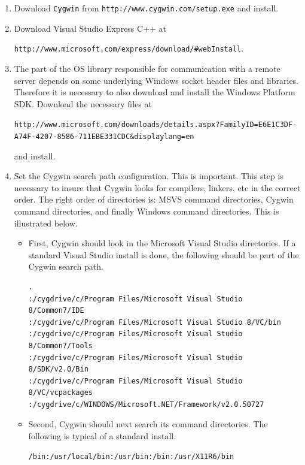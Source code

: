 \documentclass[11pt]{article}
\renewcommand{\_}{{\char"5F}}
\renewcommand{\{}{{\char"7B}}
\renewcommand{\}}{{\char"7D}}
\renewcommand{\^}{{\char"0D}}
\renewcommand{\'}{{\char"0D}}
\newcommand{\UrlCl}{http://www.microsoft.com/express/download/\#webInstall}
\newcommand{\UrlCygwinSetup}{http://www.cygwin.com/setup.exe}
\newcommand{\UrlSdk}{http://www.microsoft.com/downloads/details.aspx?FamilyID=E6E1C3DF-A74F-4207-8586-711EBE331CDC\&displaylang=en}
\begin{document}
\begin{enumerate}[Step 1:]
\item{}  Download {\tt Cygwin}  from {\tt\UrlCygwinSetup} and install.




\item{}  Download  Visual Studio Express C++ at  

{\tt\UrlCl}.


\item{}  The part of the OS library responsible for communication with a remote server depends on some
underlying Windows socket header files and libraries. Therefore it is necessary to also download and install
the Windows Platform SDK. Download the necessary files at

{\scriptsize\tt\UrlSdk}

 and install.



\item{}  Set the Cygwin search path configuration. This is important.
This step is necessary to insure that Cygwin   looks for compilers, linkers, etc in the correct order.  The right order of directories  is: MSVS command directories, Cygwin command directories, and finally Windows command directories.  This is illustrated below.

\begin{itemize}

 \item First, Cygwin should look in the Microsoft Visual Studio directories.
If a standard Visual Studio install is done, the following  should be part of the
Cygwin search path.

\begin{verbatim}
.
:/cygdrive/c/Program Files/Microsoft Visual Studio 8/Common7/IDE
:/cygdrive/c/Program Files/Microsoft Visual Studio 8/VC/bin
:/cygdrive/c/Program Files/Microsoft Visual Studio 8/Common7/Tools
:/cygdrive/c/Program Files/Microsoft Visual Studio 8/SDK/v2.0/Bin
:/cygdrive/c/Program Files/Microsoft Visual Studio 8/VC/vcpackages
:/cygdrive/c/WINDOWS/Microsoft.NET/Framework/v2.0.50727
\end{verbatim}

\item Second, Cygwin should next search its  command directories.  The following is typical of a standard install.

\begin{verbatim}
/bin:/usr/local/bin:/usr/bin:/bin:/usr/X11R6/bin
\end{verbatim}


\end{itemize}
\end{enumerate}
\end{document}
